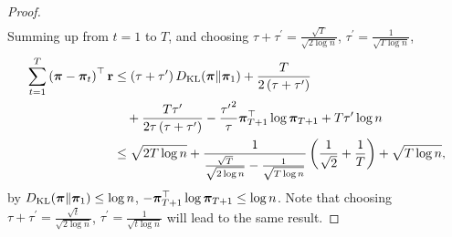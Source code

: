 \begin{proof}
\begin{equation*}
\begin{split}
\end{split}
\end{equation*}
Summing up from $t = 1$ to $T$, and choosing $\tau + \tau^\prime = \frac{\sqrt{T}}{\sqrt{2 \log{n}}}$, $\tau^\prime = \frac{1}{\sqrt{T \log{n}}}$,
\begin{equation*}
\begin{split}
    \sum\limits_{t=1}^{T}{\left( {\boldsymbol{\pi}} - {\boldsymbol{\pi}}_t \right)^\top {\mathbf{r}} } &\le \left(\tau + \tau^\prime\right) D_{\mathrm{KL}}{\left( {\boldsymbol{\pi}} \middle\| {\boldsymbol{\pi}}_1 \right)} + \frac{T}{2\left(\tau + \tau^\prime\right)} \\
    &\quad + \frac{T \tau^\prime}{2\tau \left(\tau + \tau^\prime\right)} - \frac{{\tau^\prime}^2}{\tau} {\boldsymbol{\pi}}_{T+1}^\top \log{{\boldsymbol{\pi}}_{T+1}} + T \tau^\prime \log{n} \\
    &\le \sqrt{2T \log{n}} + \frac{1}{\frac{\sqrt{T}}{\sqrt{2 \log{n}}} - \frac{1}{\sqrt{T\log{n}}}} \left( \frac{1}{\sqrt{2}}+ \frac{1}{T} \right) + \sqrt{T \log{n}},
\end{split}
\end{equation*}
by $D_{\mathrm{KL}}{\left( {\boldsymbol{\pi}} \middle\| {\boldsymbol{\pi}}_1 \right)} \le \log{n}$, $ - {\boldsymbol{\pi}}_{T+1}^\top \log{{\boldsymbol{\pi}}_{T+1}} \le \log{n}$. Note that choosing $\tau + \tau^\prime = \frac{\sqrt{t}}{\sqrt{2 \log{n}}}$, $\tau^\prime = \frac{1}{\sqrt{t \log{n}}}$ will lead to the same result.
\end{proof}






